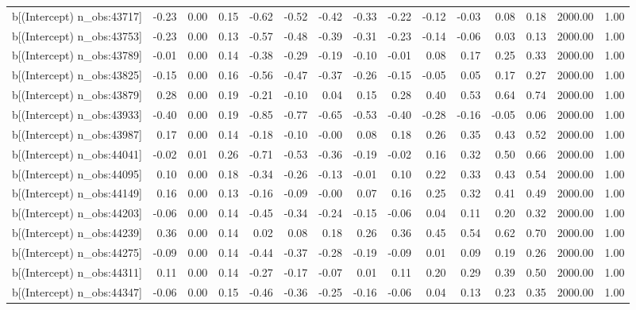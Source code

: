 \begin{table}[ht]
\begin{tabular}{rrrrrrrrrrrrrrr}
  b[(Intercept) n\_obs:43717] & -0.23 & 0.00 & 0.15 & -0.62 & -0.52 & -0.42 & -0.33 & -0.22 & -0.12 & -0.03 & 0.08 & 0.18 & 2000.00 & 1.00 \\ 
  b[(Intercept) n\_obs:43753] & -0.23 & 0.00 & 0.13 & -0.57 & -0.48 & -0.39 & -0.31 & -0.23 & -0.14 & -0.06 & 0.03 & 0.13 & 2000.00 & 1.00 \\ 
  b[(Intercept) n\_obs:43789] & -0.01 & 0.00 & 0.14 & -0.38 & -0.29 & -0.19 & -0.10 & -0.01 & 0.08 & 0.17 & 0.25 & 0.33 & 2000.00 & 1.00 \\ 
  b[(Intercept) n\_obs:43825] & -0.15 & 0.00 & 0.16 & -0.56 & -0.47 & -0.37 & -0.26 & -0.15 & -0.05 & 0.05 & 0.17 & 0.27 & 2000.00 & 1.00 \\ 
  b[(Intercept) n\_obs:43879] & 0.28 & 0.00 & 0.19 & -0.21 & -0.10 & 0.04 & 0.15 & 0.28 & 0.40 & 0.53 & 0.64 & 0.74 & 2000.00 & 1.00 \\ 
  b[(Intercept) n\_obs:43933] & -0.40 & 0.00 & 0.19 & -0.85 & -0.77 & -0.65 & -0.53 & -0.40 & -0.28 & -0.16 & -0.05 & 0.06 & 2000.00 & 1.00 \\ 
  b[(Intercept) n\_obs:43987] & 0.17 & 0.00 & 0.14 & -0.18 & -0.10 & -0.00 & 0.08 & 0.18 & 0.26 & 0.35 & 0.43 & 0.52 & 2000.00 & 1.00 \\ 
  b[(Intercept) n\_obs:44041] & -0.02 & 0.01 & 0.26 & -0.71 & -0.53 & -0.36 & -0.19 & -0.02 & 0.16 & 0.32 & 0.50 & 0.66 & 2000.00 & 1.00 \\ 
  b[(Intercept) n\_obs:44095] & 0.10 & 0.00 & 0.18 & -0.34 & -0.26 & -0.13 & -0.01 & 0.10 & 0.22 & 0.33 & 0.43 & 0.54 & 2000.00 & 1.00 \\ 
  b[(Intercept) n\_obs:44149] & 0.16 & 0.00 & 0.13 & -0.16 & -0.09 & -0.00 & 0.07 & 0.16 & 0.25 & 0.32 & 0.41 & 0.49 & 2000.00 & 1.00 \\ 
  b[(Intercept) n\_obs:44203] & -0.06 & 0.00 & 0.14 & -0.45 & -0.34 & -0.24 & -0.15 & -0.06 & 0.04 & 0.11 & 0.20 & 0.32 & 2000.00 & 1.00 \\ 
  b[(Intercept) n\_obs:44239] & 0.36 & 0.00 & 0.14 & 0.02 & 0.08 & 0.18 & 0.26 & 0.36 & 0.45 & 0.54 & 0.62 & 0.70 & 2000.00 & 1.00 \\ 
  b[(Intercept) n\_obs:44275] & -0.09 & 0.00 & 0.14 & -0.44 & -0.37 & -0.28 & -0.19 & -0.09 & 0.01 & 0.09 & 0.19 & 0.26 & 2000.00 & 1.00 \\ 
  b[(Intercept) n\_obs:44311] & 0.11 & 0.00 & 0.14 & -0.27 & -0.17 & -0.07 & 0.01 & 0.11 & 0.20 & 0.29 & 0.39 & 0.50 & 2000.00 & 1.00 \\ 
  b[(Intercept) n\_obs:44347] & -0.06 & 0.00 & 0.15 & -0.46 & -0.36 & -0.25 & -0.16 & -0.06 & 0.04 & 0.13 & 0.23 & 0.35 & 2000.00 & 1.00 \\ 

\end{tabular}
\end{table}
